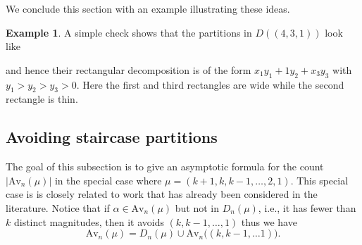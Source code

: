 \documentclass{article}
\theoremstyle{plain}
\newtheorem{theorem}{Theorem}[section]
\theoremstyle{definition}
\newtheorem{example}[theorem]{Example}
\newcommand{\Av}{\text{Av}}
\begin{document}
We conclude this section with an example illustrating these ideas.  

\begin{example}
A simple check shows that the partitions in  $D((4,3,1))$ look like
\begin{center}
\end{center}
and hence their rectangular decomposition is of the form $x_1y_1 + 1y_2 + x_3y_3$ with $y_1>y_2>y_3>0$.  Here the first and third rectangles are wide while the second rectangle is  thin.  
\end{example}













\subsection{Avoiding staircase partitions}\label{ssec:staircases}

The goal of this subsection is to give an asymptotic formula for the count $|\Av_n(\mu)|$ in the special case where  $\mu=(k+1,k,k-1,\ldots, 2,1)$.  This special case is  is closely related to work that has already been considered in the literature.  Notice that if $\alpha \in \Av_n(\mu)$ but not in $D_n(\mu)$, i.e., it has fewer than $k$ distinct magnitudes, then it avoids $(k,k-1,\ldots, 1)$ thus we have
\begin{equation}
    \Av_n(\mu) = D_n(\mu) \cup \Av_n\big((k,k-1,\ldots 1)\big). \label{eqn:stairdecomp}
\end{equation}
\end{document}
